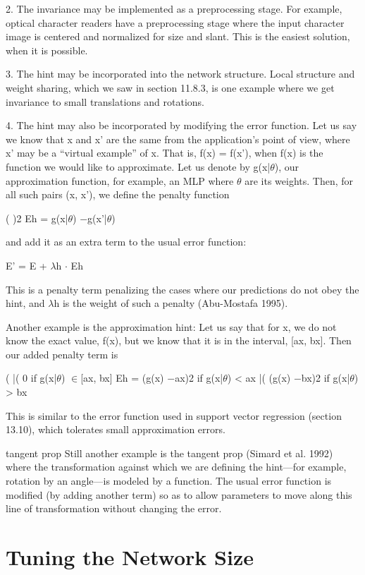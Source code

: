 2. The invariance may be implemented as a preprocessing stage. For example, optical character readers have a preprocessing stage where the input character image is centered and normalized for size and slant. This is the easiest solution, when it is possible.

3. The hint may be incorporated into the network structure. Local structure and weight sharing, which we saw in section 11.8.3, is one example where we get invariance to small translations and rotations.

4. The hint may also be incorporated by modifying the error function. Let us say we know that x and x' are the same from the application’s point of view, where x' may be a “virtual example” of x. That is, f(x) = f(x'), when f(x) is the function we would like to approximate. Let us denote by g(x|$\theta$), our approximation function, for example, an MLP where $\theta$ are its weights. Then, for all such pairs (x, x'), we define the penalty function

( )2 Eh = g(x|$\theta$) $-$g(x'|$\theta$)

and add it as an extra term to the usual error function:

E' = E + $\lambda$h $\cdot$ Eh

This is a penalty term penalizing the cases where our predictions do not obey the hint, and $\lambda$h is the weight of such a penalty (Abu-Mostafa 1995).

Another example is the approximation hint: Let us say that for x, we do not know the exact value, f(x), but we know that it is in the interval, [ax, bx]. Then our added penalty term is

( |( 0 if g(x|$\theta$) $\in$[ax, bx] Eh = (g(x) $-$ax)2 if g(x|$\theta$) < ax |( (g(x) $-$bx)2 if g(x|$\theta$) > bx

This is similar to the error function used in support vector regression (section 13.10), which tolerates small approximation errors.

tangent prop Still another example is the tangent prop (Simard et al. 1992) where the transformation against which we are defining the hint---for example, rotation by an angle---is modeled by a function. The usual error function is modified (by adding another term) so as to allow parameters to move along this line of transformation without changing the error.

\section{Tuning the Network Size}

